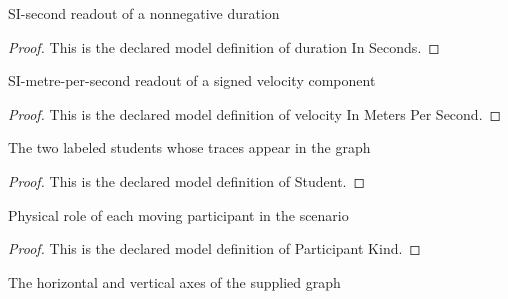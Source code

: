 \begin{definition}
  \label{def:physics:phyx-mini-0829:phyxminiproblems-problemphyxmini0829-durationinseconds}
  SI-second readout of a nonnegative duration
\end{definition}
\begin{proof}
  This is the declared model definition of duration In Seconds.
\end{proof}
\begin{definition}
  \label{def:physics:phyx-mini-0829:phyxminiproblems-problemphyxmini0829-velocityinmeterspersecond}
  SI-metre-per-second readout of a signed velocity component
\end{definition}
\begin{proof}
  This is the declared model definition of velocity In Meters Per Second.
\end{proof}
\begin{definition}[Student]
  \label{def:physics:phyx-mini-0829:phyxminiproblems-problemphyxmini0829-student}
  The two labeled students whose traces appear in the graph
\end{definition}
\begin{proof}
  This is the declared model definition of Student.
\end{proof}
\begin{definition}
  \label{def:physics:phyx-mini-0829:phyxminiproblems-problemphyxmini0829-participantkind}
  Physical role of each moving participant in the scenario
\end{definition}
\begin{proof}
  This is the declared model definition of Participant Kind.
\end{proof}
\begin{definition}
  \label{def:physics:phyx-mini-0829:phyxminiproblems-problemphyxmini0829-graphaxis}
  The horizontal and vertical axes of the supplied graph
\end{definition}
